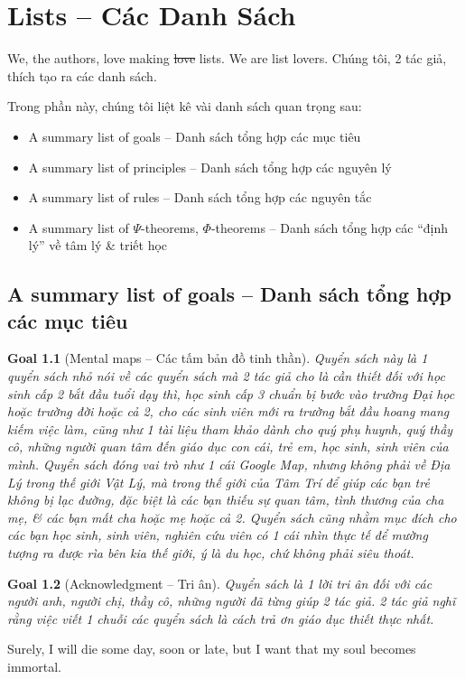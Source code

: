 \documentclass[12pt,twoside]{book}
\newtheorem{goal}{Goal}
\begin{document}

\chapter{Lists -- Các Danh Sách}
\minitoc
We, the authors, love making \st{love} lists. We are list lovers. Chúng tôi, 2 tác giả, thích tạo ra các danh sách.

Trong phần này, chúng tôi liệt kê vài danh sách quan trọng sau:
\begin{itemize}
	\item A summary list of goals -- Danh sách tổng hợp các mục tiêu
	\item A summary list of principles -- Danh sách tổng hợp các nguyên lý
	\item A summary list of rules -- Danh sách tổng hợp các nguyên tắc
	\item A summary list of $\Psi$-theorems, $\Phi$-theorems -- Danh sách tổng hợp các ``định lý'' về tâm lý \& triết học
\end{itemize}

\section{A summary list of goals -- Danh sách tổng hợp các mục tiêu}

\begin{goal}[Mental maps -- Các tấm bản đồ tinh thần]
	Quyển sách này là 1 quyển sách nhỏ nói về các quyển sách mà 2 tác giả cho là cần thiết đối với học sinh cấp 2 bắt đầu tuổi dạy thì, học sinh cấp 3 chuẩn bị bước vào trường Đại học hoặc trường đời hoặc cả 2, cho các sinh viên mới ra trường bắt đầu hoang mang kiếm việc làm, cũng như 1 tài liệu tham khảo dành cho quý phụ huynh, quý thầy cô, những người quan tâm đến giáo dục con cái, trẻ em, học sinh, sinh viên của mình. Quyển sách đóng vai trò như 1 cái Google Map, nhưng không phải về Địa Lý trong thế giới Vật Lý, mà trong thế giới của Tâm Trí để giúp các bạn trẻ không bị lạc đường, đặc biệt là các bạn thiếu sự quan tâm, tình thương của cha mẹ, \& các bạn mất cha hoặc mẹ hoặc cả 2. Quyển sách cũng nhằm mục đích cho các bạn học sinh, sinh viên, nghiên cứu viên có 1 cái nhìn thực tế để mường tượng ra được rìa bên kia thế giới, ý là du học, chứ không phải siêu thoát.
\end{goal}

\begin{goal}[Acknowledgment -- Tri ân]
	Quyển sách là 1 lời tri ân đối với các người anh, người chị, thầy cô, những người đã từng giúp 2 tác giả. 2 tác giả nghĩ rằng việc viết 1 chuỗi các quyển sách là cách trả ơn giáo dục thiết thực nhất.
\end{goal}
Surely, I will die some day, soon or late, but I want that my soul becomes immortal.
\end{document}
